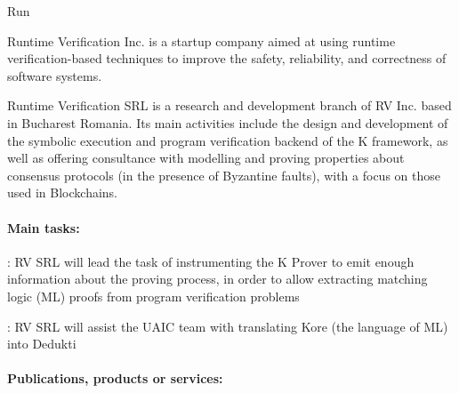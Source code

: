 \begin{sitedescription}{Run}



Runtime Verification Inc. is a startup company aimed at using runtime verification-based
techniques to improve the safety, reliability, and correctness of software systems.

Runtime Verification SRL is a research and development branch of RV Inc. based
in Bucharest Romania.  Its main activities include the design and development of
the symbolic execution and program verification backend of the K framework,
as well as offering consultance with modelling and proving properties about
consensus protocols (in the presence of Byzantine faults),
with a focus on those used in Blockchains.

\paragraph*{Main tasks:}



\begin{compactitem}
\item {}: RV SRL will lead the task of
  instrumenting the K Prover to emit enough information about the
  proving process, in order to allow extracting matching logic (ML)
  proofs from program verification problems
\item {}: RV SRL will assist the UAIC team
  with translating Kore (the language of ML) into Dedukti
\end{compactitem}

\paragraph*{Publications, products or services:}



\end{sitedescription}
